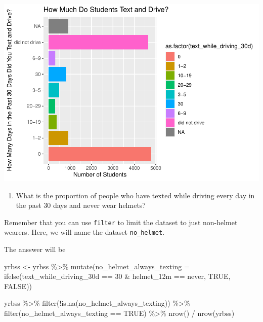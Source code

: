 \documentclass[
]{article}
\newenvironment{Shaded}{\begin{snugshade}}{\end{snugshade}}
\newcommand{\AttributeTok}[1]{\textcolor[rgb]{0.77,0.63,0.00}{#1}}
\newcommand{\ConstantTok}[1]{\textcolor[rgb]{0.00,0.00,0.00}{#1}}
\newcommand{\FunctionTok}[1]{\textcolor[rgb]{0.00,0.00,0.00}{#1}}
\newcommand{\NormalTok}[1]{#1}
\newcommand{\OtherTok}[1]{\textcolor[rgb]{0.56,0.35,0.01}{#1}}
\newcommand{\SpecialCharTok}[1]{\textcolor[rgb]{0.00,0.00,0.00}{#1}}
\newcommand{\StringTok}[1]{\textcolor[rgb]{0.31,0.60,0.02}{#1}}
\providecommand{\tightlist}{%
  \setlength{\itemsep}{0pt}\setlength{\parskip}{0pt}}
\begin{document}
\includegraphics{Lab6_inf_for_categorical_data_files/figure-latex/unnamed-chunk-3-1.pdf}

\begin{enumerate}
\def\labelenumi{\arabic{enumi}.}
\setcounter{enumi}{1}
\tightlist
\item
  What is the proportion of people who have texted while driving every
  day in the past 30 days and never wear helmets?
\end{enumerate}

Remember that you can use \texttt{filter} to limit the dataset to just
non-helmet wearers. Here, we will name the dataset \texttt{no\_helmet}.

The ansswer will be

\begin{Shaded}
\begin{Highlighting}[]
\NormalTok{yrbss }\OtherTok{\textless{}{-}}\NormalTok{ yrbss }\SpecialCharTok{\%\textgreater{}\%} 
  \FunctionTok{mutate}\NormalTok{(}\AttributeTok{no\_helmet\_always\_texting =} 
           \FunctionTok{ifelse}\NormalTok{(text\_while\_driving\_30d }\SpecialCharTok{==} \StringTok{\textquotesingle{}30\textquotesingle{}} \SpecialCharTok{\&}
\NormalTok{                  helmet\_12m }\SpecialCharTok{==} \StringTok{\textquotesingle{}never\textquotesingle{}}\NormalTok{, }\ConstantTok{TRUE}\NormalTok{, }\ConstantTok{FALSE}\NormalTok{)) }

\NormalTok{yrbss }\SpecialCharTok{\%\textgreater{}\%} 
  \FunctionTok{filter}\NormalTok{(}\SpecialCharTok{!}\FunctionTok{is.na}\NormalTok{(no\_helmet\_always\_texting)) }\SpecialCharTok{\%\textgreater{}\%} 
    \FunctionTok{filter}\NormalTok{(no\_helmet\_always\_texting }\SpecialCharTok{==} \ConstantTok{TRUE}\NormalTok{) }\SpecialCharTok{\%\textgreater{}\%}
      \FunctionTok{nrow}\NormalTok{() }\SpecialCharTok{/} \FunctionTok{nrow}\NormalTok{(yrbss)}
\end{Highlighting}
\end{Shaded}
\end{document}
